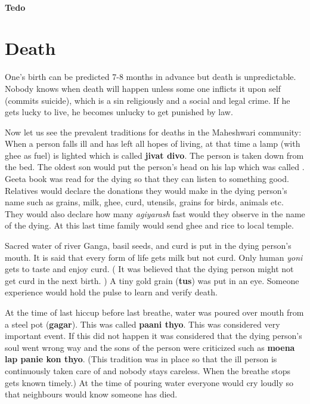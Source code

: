 \paragraph{Tedo}
\par
\begin{center} \par\end{center}

\begin{center} \par\end{center}

\section{Death} 
One's birth can be predicted 7-8 months in advance but death is unpredictable.
Nobody knows when death will happen unless some one inflicts it upon self
(commits suicide), which is a sin religiously and a social and legal crime. If
he gets lucky to live, he becomes unlucky to get punished by law.

Now let us see the prevalent traditions for deaths in the Maheshwari community:
When a person falls ill and has left all hopes of living, at that time a lamp
(with ghee as fuel) is lighted which is called \textbf{jivat divo}. The person
is taken down from the bed. The oldest son would put the person's head on his
lap which was called . Geeta book was read for the dying so
that they can listen to something good. Relatives would declare the donations
they would make in the dying person's name such as grains, milk, ghee, curd,
utensils, grains for birds, animals etc. They would also declare how many
\textit{agiyarash} fast would they observe in the name of the dying. At this
last time family would send ghee and rice to local temple.

Sacred water of river Ganga, basil seeds, and curd is put in the dying person's
mouth. It is said that every form of life gets milk but not curd. Only human
\textit{yoni} gets to taste and enjoy curd. ( It was believed that the dying
person might not get curd in the next birth. ) A tiny gold grain (\textbf{tus})
was put in an eye. Someone experience would hold the pulse to learn and verify
death.

At the time of last hiccup before last breathe, water was poured over mouth
from a steel pot (\textbf{gagar}). This was called \textbf{paani thyo}. This
was considered very important event. If  this did not happen it was considered
that the dying person's soul went wrong way and the sons of the person were
criticized such as \textbf{moena lap panie kon thyo}. (This tradition was in
place so that the ill person is continuously taken care of and nobody stays
careless. When the breathe stops gets known timely.) At the time of pouring
water everyone would cry loudly so that neighbours would know someone has died.

